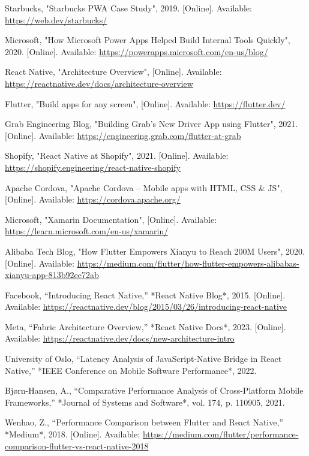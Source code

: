 \documentclass[12pt]{report}
\begin{document}
\begin{thebibliography}{1}
Starbucks, "Starbucks PWA Case Study", 2019. [Online]. Available: \url{https://web.dev/starbucks/}

Microsoft, "How Microsoft Power Apps Helped Build Internal Tools Quickly", 2020. [Online]. Available: \url{https://powerapps.microsoft.com/en-us/blog/}

React Native, "Architecture Overview", [Online]. Available: \url{https://reactnative.dev/docs/architecture-overview}

Flutter, "Build apps for any screen", [Online]. Available: \url{https://flutter.dev/}

Grab Engineering Blog, "Building Grab’s New Driver App using Flutter", 2021. [Online]. Available: \url{https://engineering.grab.com/flutter-at-grab}

Shopify, "React Native at Shopify", 2021. [Online]. Available: \url{https://shopify.engineering/react-native-shopify}

Apache Cordova, "Apache Cordova – Mobile apps with HTML, CSS \& JS", [Online]. Available: \url{https://cordova.apache.org/}

Microsoft, "Xamarin Documentation", [Online]. Available: \url{https://learn.microsoft.com/en-us/xamarin/}

Alibaba Tech Blog, "How Flutter Empowers Xianyu to Reach 200M Users", 2020. [Online]. Available: \url{https://medium.com/flutter/how-flutter-empowers-alibabas-xianyu-app-813b92ee72ab}
  
Facebook, “Introducing React Native,” *React Native Blog*, 2015. [Online]. Available: \url{https://reactnative.dev/blog/2015/03/26/introducing-react-native}

Meta, “Fabric Architecture Overview,” *React Native Docs*, 2023. [Online]. Available: \url{https://reactnative.dev/docs/new-architecture-intro}

University of Oslo, “Latency Analysis of JavaScript-Native Bridge in React Native,” *IEEE Conference on Mobile Software Performance*, 2022.

Bjørn-Hansen, A., “Comparative Performance Analysis of Cross-Platform Mobile Frameworks,” *Journal of Systems and Software*, vol. 174, p. 110905, 2021.

Wenhao, Z., “Performance Comparison between Flutter and React Native,” *Medium*, 2018. [Online]. Available: \url{https://medium.com/flutter/performance-comparison-flutter-vs-react-native-2018}


\end{thebibliography}
\end{document}
